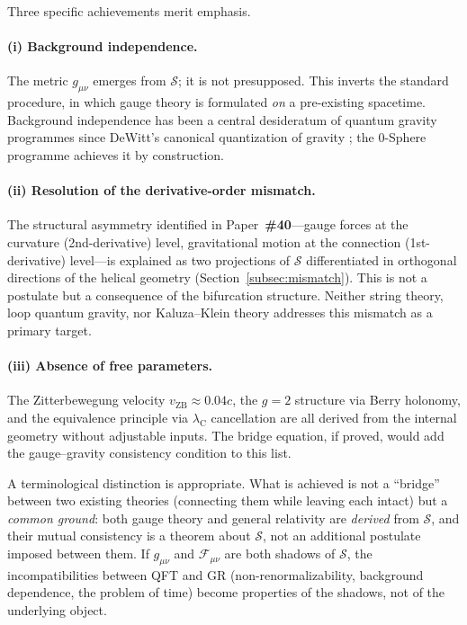 \documentclass[12pt,letterpaper]{article}
\newcommand{\paperno}[1]{\textbf{\#{}#1}}
\newcommand{\vZB}{v_{\mathrm{ZB}}}
\newcommand{\lambdaC}{\lambda_{\mathrm{C}}}
\newcommand{\calS}{\mathcal{S}}
\begin{document}
\noindent Three specific achievements merit emphasis.

\paragraph{(i) Background independence.}
The metric $g_{\mu\nu}$ emerges from $\calS$; it is not presupposed.
This inverts the standard procedure, in which gauge theory is formulated
\emph{on} a pre-existing spacetime.
Background independence has been a central desideratum of quantum gravity
programmes since DeWitt's canonical quantization of gravity \cite{DeWitt1967};
the 0-Sphere programme achieves it by construction.

\paragraph{(ii) Resolution of the derivative-order mismatch.}
The structural asymmetry identified in Paper~\paperno{40}---gauge forces
at the curvature (2nd-derivative) level, gravitational motion at the
connection (1st-derivative) level---is explained as two projections
of $\calS$ differentiated in orthogonal directions of the helical geometry
(Section~\ref{subsec:mismatch}).
This is not a postulate but a consequence of the bifurcation structure.
Neither string theory, loop quantum gravity, nor Kaluza--Klein theory
addresses this mismatch as a primary target.

\paragraph{(iii) Absence of free parameters.}
The Zitterbewegung velocity $\vZB\approx 0.04c$, the $g=2$ structure
via Berry holonomy, and the equivalence principle via $\lambdaC$ cancellation
are all derived from the internal geometry without adjustable inputs.
The bridge equation, if proved, would add the gauge--gravity consistency
condition to this list.

\medskip
\noindent A terminological distinction is appropriate.
What is achieved is not a ``bridge'' between two existing theories
(connecting them while leaving each intact) but a \emph{common ground}:
both gauge theory and general relativity are \emph{derived} from $\calS$,
and their mutual consistency is a theorem about $\calS$,
not an additional postulate imposed between them.
If $g_{\mu\nu}$ and $\mathcal{F}_{\mu\nu}$ are both shadows of $\calS$,
the incompatibilities between QFT and GR
(non-renormalizability, background dependence, the problem of time)
become properties of the shadows, not of the underlying object.
\end{document}
